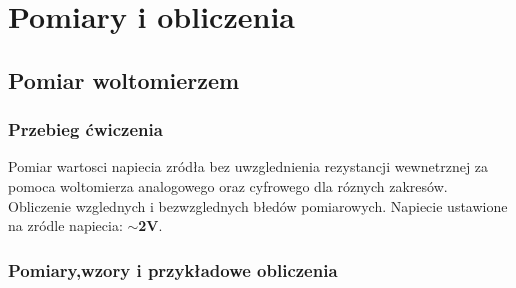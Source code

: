 \documentclass{extarticle}  %
\begin{document}
    \section{Pomiary i obliczenia}
        \subsection{Pomiar woltomierzem}
            \subsubsection{Przebieg ćwiczenia}
                Pomiar wartosci napiecia zródła bez uwzglednienia rezystancji wewnetrznej za
                pomoca woltomierza analogowego oraz cyfrowego dla róznych
                zakresów. Obliczenie wzglednych i bezwzglednych błedów pomiarowych.
                Napiecie ustawione na zródle napiecia: \textbf{$\sim$2V}.
            
            \subsubsection{Pomiary,wzory i przykładowe obliczenia}
                \begin{table}[H]
                    \caption{Wyniki pomiarowe oraz błędy pomiarowe dla ustalonego napięcia $\sim$ 2V dla woltomierza analogowego}
                    \centering
                \end{table}
\end{document}
